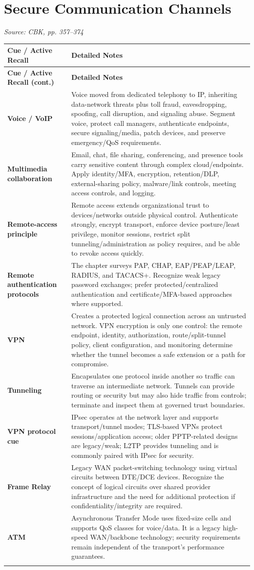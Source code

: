 \documentclass[10pt,letterpaper]{article}
\makeatletter
\newenvironment{cornell}{\rowcolors{2}{white}{notebg}\begin{longtable}{@{}>{\raggedright\arraybackslash\columncolor{cuebg}\color{navy}\bfseries}p{0.285\textwidth}>{\raggedright\arraybackslash}p{0.65\textwidth}@{}}\rowcolor{navy}\color{white}\textbf{Cue / Active Recall} & \color{white}\textbf{Detailed Notes}\\ \hline\endfirsthead\rowcolor{navy}\color{white}\textbf{Cue / Active Recall (cont.)} & \color{white}\textbf{Detailed Notes}\\ \hline\endhead}{\end{longtable}}
\newcommand{\noterow}[2]{#1 & #2\\\arrayrulecolor{line}\hline}\newcommand{\source}[1]{\par{\footnotesize\color{teal}\textit{Source: CBK, #1}}\par}
\makeatother
\begin{document}
\section{\color{navy}Secure Communication Channels}
\source{pp. 357--374}
\begin{cornell}
\noterow{Voice / VoIP}{Voice moved from dedicated telephony to IP, inheriting data-network threats plus toll fraud, eavesdropping, spoofing, call disruption, and signaling abuse. Segment voice, protect call managers, authenticate endpoints, secure signaling/media, patch devices, and preserve emergency/QoS requirements.}
\noterow{Multimedia collaboration}{Email, chat, file sharing, conferencing, and presence tools carry sensitive content through complex cloud/endpoints. Apply identity/MFA, encryption, retention/DLP, external-sharing policy, malware/link controls, meeting access controls, and logging.}
\noterow{Remote-access principle}{Remote access extends organizational trust to devices/networks outside physical control. Authenticate strongly, encrypt transport, enforce device posture/least privilege, monitor sessions, restrict split tunneling/administration as policy requires, and be able to revoke access quickly.}
\noterow{Remote authentication protocols}{The chapter surveys PAP, CHAP, EAP/PEAP/LEAP, RADIUS, and TACACS+. Recognize weak legacy password exchanges; prefer protected/centralized authentication and certificate/MFA-based approaches where supported.}
\noterow{VPN}{Creates a protected logical connection across an untrusted network. VPN encryption is only one control: the remote endpoint, identity, authorization, route/split-tunnel policy, client configuration, and monitoring determine whether the tunnel becomes a safe extension or a path for compromise.}
\noterow{Tunneling}{Encapsulates one protocol inside another so traffic can traverse an intermediate network. Tunnels can provide routing or security but may also hide traffic from controls; terminate and inspect them at governed trust boundaries.}
\noterow{VPN protocol cue}{IPsec operates at the network layer and supports transport/tunnel modes; TLS-based VPNs protect sessions/application access; older PPTP-related designs are legacy/weak; L2TP provides tunneling and is commonly paired with IPsec for security.}
\noterow{Frame Relay}{Legacy WAN packet-switching technology using virtual circuits between DTE/DCE devices. Recognize the concept of logical circuits over shared provider infrastructure and the need for additional protection if confidentiality/integrity are required.}
\noterow{ATM}{Asynchronous Transfer Mode uses fixed-size cells and supports QoS classes for voice/data. It is a legacy high-speed WAN/backbone technology; security requirements remain independent of the transport's performance guarantees.}

\end{cornell}
\end{document}

